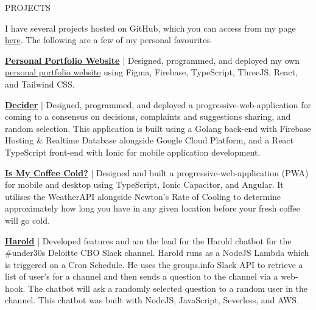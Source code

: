 \documentclass{resume} %
\begin{document}
\begin{rSection}{PROJECTS}
\vspace{-1.25em}
\item {I have several projects hosted on GitHub, which you can access from my page \href{https://github.com/jamestkelly}{here}. The following are a few of my personal favourites.}
\item \textbf{\href{https://github.com/jamestkelly/personal-portfolio}{Personal Portfolio Website}} {| Designed, programmed, and deployed my own \href{https://jim-t-kelly.web.app}{personal portfolio website} using Figma, Firebase, TypeScript, ThreeJS, React, and Tailwind CSS.}
\item \textbf{\href{https://github.com/jamestkelly/decider}{Decider}} {| Designed, programmed, and deployed a progressive-web-application for coming to a consensus on decisions, complaints and suggestions sharing, and random selection. This application is built using a Golang back-end with Firebase Hosting \& Realtime Database alongside Google Cloud Platform, and a React TypeScript front-end with Ionic for mobile application development.}
\item \textbf{\href{https://github.com/jamestkelly/is-my-coffee-cold}{Is My Coffee Cold?}} {| Designed and built a progressive-web-application (PWA) for mobile and desktop using TypeScript, Ionic Capacitor, and Angular. It utilises the WeatherAPI alongside Newton's Rate of Cooling to determine approximately how long you have in any given location before your fresh coffee will go cold.}
\item \textbf{\href{https://github.com/jamestkelly/harold}{Harold}} {| Developed features and am the lead for the Harold chatbot for the \#under30s Deloitte CBO Slack channel. Harold runs as a NodeJS Lambda which is triggered on a Cron Schedule. He uses the groups.info Slack API to retrieve a list of user's for a channel and then sends a question to the channel via a web-hook. The chatbot will ask a randomly selected question to a random user in the channel. This chatbot was built with NodeJS, JavaScript, Severless, and AWS.}

\end{rSection} 
\end{document}
